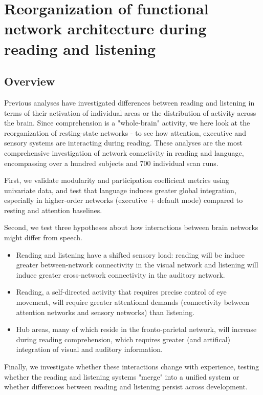 \chapter{Reorganization of functional network architecture during reading and listening}

\section{Overview}

Previous analyses have investigated differences between reading and listening in terms of their activation of individual areas or the distribution of activity across the brain. Since comprehension is a "whole-brain" activity, we here look at the reorganization of resting-state networks - to see how attention, executive and sensory systems are interacting during reading.  These analyses are the most comprehensive investigation of network connctivity in reading and language, encompassing over a hundred subjects and 700 individual scan runs. 

First, we validate modularity and participation coefficient metrics using univariate data, and test that language induces greater global integration, especially in higher-order networks (executive + default mode) compared to resting and attention baselines.

Second, we test three hypotheses about how interactions between brain networks might differ from speech.
\begin{itemize}
	\item Reading and listening have a shifted sensory load: reading will be induce greater between-network connectivity in the visual network and listening will induce greater cross-network connectivity in the auditory network.  
	\item Reading, a self-directed activity that requires precise control of eye movement, will require greater attentional demands (connectivity between attention networks and sensory networks) than listening. 
	\item Hub areas, many of which reside in the fronto-parietal network, will increase during reading comprehension, which requires greater (and artifical) integration of visual and auditory information.
\end{itemize}

Finally, we investigate whether these interactions change with experience, testing whether the reading and listening systems "merge" into a unified system or whether differences between reading and listening persist across development.

